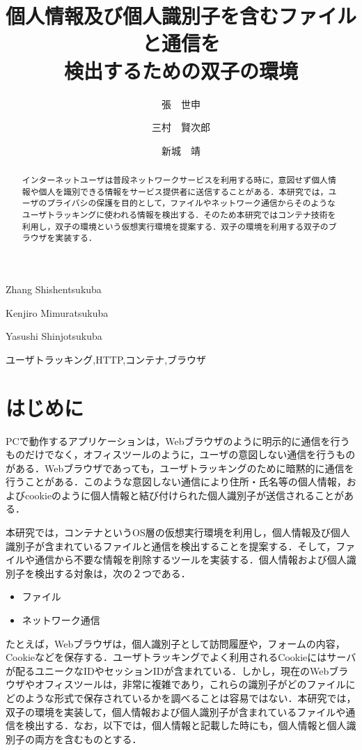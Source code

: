 \documentclass[submit,techrep]{ipsj}
\begin{document}
\title{個人情報及び個人識別子を含むファイルと通信を\\
検出するための双子の環境}




\author{張　世申}{Zhang Shishen}{tsukuba}
\author{三村　賢次郎}{Kenjiro Mimura}{tsukuba}
\author{新城　靖}{Yasushi Shinjo}{tsukuba}

\begin{abstract}
インターネットユーザは普段ネットワークサービスを利用する時に，意図せず個人情報や個人を識別できる情報をサービス提供者に送信することがある．本研究では，ユーザのプライバシの保護を目的として，ファイルやネットワーク通信からそのようなユーザトラッキングに使われる情報を検出する．そのため本研究ではコンテナ技術を利用し，双子の環境という仮想実行環境を提案する．双子の環境を利用する双子のブラウザを実装する．
\end{abstract}


\begin{jkeyword}
ユーザトラッキング,HTTP,コンテナ,ブラウザ
\end{jkeyword}



\maketitle


\section{はじめに}
PCで動作するアプリケーションは，Webブラウザのように明示的に通信を行うものだけでなく，オフィスツールのように，ユーザの意図しない通信を行うものがある．Webブラウザであっても，ユーザトラッキングのために暗黙的に通信を行うことがある．このような意図しない通信により住所・氏名等の個人情報，およびcookieのように個人情報と結び付けられた個人識別子が送信されることがある．

本研究では，コンテナというOS層の仮想実行環境を利用し，個人情報及び個人識別子が含まれているファイルと通信を検出することを提案する．そして，ファイルや通信から不要な情報を削除するツールを実装する．個人情報および個人識別子を検出する対象は，次の２つである．
\begin{itemize}
\item
ファイル
\item
ネットワーク通信 
\end{itemize}

たとえば，Webブラウザは，個人識別子として訪問履歴や，フォームの内容，Cookieなどを保存する．ユーザトラッキングでよく利用されるCookieにはサーバが配るユニークなIDやセッションIDが含まれている．しかし，現在のWebブラウザやオフィスツールは，非常に複雑であり，これらの識別子がどのファイルにどのような形式で保存されているかを調べることは容易ではない．本研究では，双子の環境を実装して，個人情報および個人識別子が含まれているファイルや通信を検出する．なお，以下では，個人情報と記載した時にも，個人情報と個人識別子の両方を含むものとする．
\end{document}
